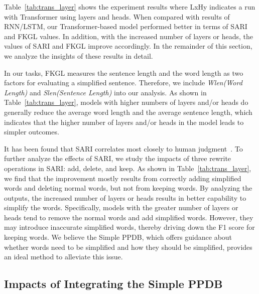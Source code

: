 \documentclass[11pt,a4paper]{article}
\begin{document}
Table~\ref{tab:trans_layer} shows the experiment results where LxHy indicates a run with Transformer using  layers and  heads. When compared with results of RNN/LSTM, our Transformer-based model performed better in terms of SARI and FKGL values.
In addition, with the increased number of layers or heads, the values of SARI and FKGL improve accordingly.
In the remainder of this section, we analyze the insights of these results in detail.

In our tasks, FKGL measures the sentence length and the word length as two factors for evaluating a simplified sentence. Therefore, we include \textit{Wlen(Word Length)} and \textit{Slen(Sentence Length)} into our analysis. As shown in Table~\ref{tab:trans_layer}, models with higher numbers of layers and/or heads do generally reduce the average word length and the average sentence length, which indicates that the higher number of layers and/or heads in the model leads to simpler outcomes.

It has been found that SARI correlates most closely to human judgment~\cite{xu2016optimizing}. To further analyze the effects of SARI, we study the impacts of three rewrite operations in SARI: add, delete, and keep. As shown in Table~\ref{tab:trans_layer}, we find that the improvement mostly results from correctly adding simplified words and deleting normal words, but not from keeping words. By analyzing the outputs, the increased number of layers or heads results in better capability to simplify the words. Specifically, models with the greater number of layers or heads tend to remove the normal words and add simplified words. However, they may introduce inaccurate simplified words, thereby driving down the F1 score for keeping words. We believe the Simple PPDB, which offers guidance about whether words need to be simplified and how they should be simplified, provides an ideal method to alleviate this issue.


\subsection{Impacts of Integrating the Simple PPDB}
\label{sec:result-simpleppdb}
\end{document}
